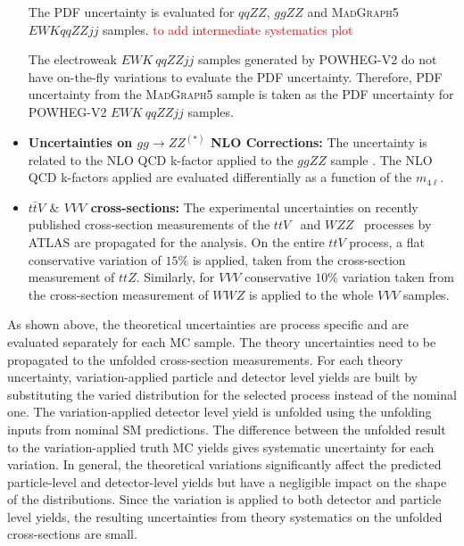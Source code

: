 \begin{itemize}
{The PDF uncertainty is evaluated for $qqZZ$, $ggZZ$ and \textsc{MadGraph5} $EWK qqZZjj$ samples. \textcolor{red}{to add intermediate systematics plot}  %


The electroweak $EWK~qqZZjj$ samples generated by \textsc{POWHEG-V2} do not have on-the-fly variations to evaluate the PDF uncertainty. Therefore, PDF uncertainty from the \textsc{MadGraph5} sample is taken as the PDF uncertainty for \textsc{POWHEG-V2} $EWK~qqZZjj$ samples.
}
\item{\textbf{Uncertainties on $gg\rightarrow ZZ^{(\ast)}$ NLO Corrections:}
The uncertainty is related to the NLO QCD k-factor applied to the $ggZZ$ sample \cite{ggZZNLOUnc}. The NLO QCD k-factors applied are evaluated differentially as a function of the $m_{4\ell}$. 
}

\item{\textbf{$t\bar{t}V$ $\&$ $VVV$ cross-sections:}
The experimental uncertainties on recently published cross-section measurements of the $ttV$~\cite{ATLAS_ttV} and $WZZ$~\cite{ATLAS_VVV} processes by ATLAS are propagated for the analysis. On the entire $ttV$ process, a flat conservative variation of $15\%$ is applied, taken from the cross-section measurement of $ttZ$. Similarly, for $VVV$ conservative $10\%$ variation taken from the cross-section measurement of $WWZ$ is applied to the whole $VVV$ samples.
}

\end{itemize}

As shown above, the theoretical uncertainties are process specific and are evaluated separately for each MC sample. The theory uncertainties need to be propagated to the unfolded cross-section measurements. For each theory uncertainty, variation-applied particle and detector level yields are built by substituting the varied distribution for the selected process instead of the nominal one. The variation-applied detector level yield is unfolded using the unfolding inputs from nominal SM predictions. The difference between the unfolded result to the variation-applied truth MC yields gives systematic uncertainty for each variation. In general, the theoretical variations significantly affect the predicted particle-level and detector-level yields but have a negligible impact on the shape of the distributions. Since the variation is applied to both detector and particle level yields, the resulting uncertainties from theory systematics on the unfolded cross-sections are small.

